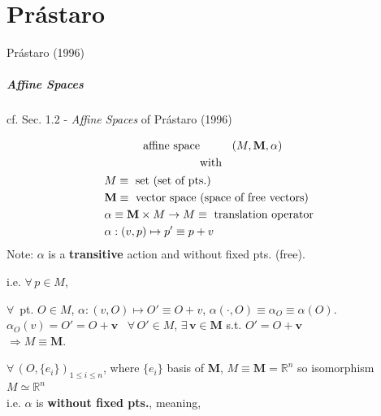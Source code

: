\part{Pr\'{a}staro}


Pr\'{a}staro (1996) \cite{dgdt:Pras1996}

\subsubsection{Affine Spaces}

cf. Sec. 1.2 - \emph{Affine Spaces} of Pr\'{a}staro (1996) \cite{dgdt:Pras1996}

\begin{definition}
  \begin{equation}
\begin{gathered}
    \text{ affine space \qquad \, } (M, \mathbf{M}, \alpha )  \\
    \text{ with } \\
    \begin{aligned}
      & M \equiv \text{ set (set of pts.) }  \\ 
      & \mathbf{M} \equiv \text{ vector space (space of free vectors) } \\
      & \alpha \equiv \mathbf{M} \times M \to M \equiv \text{ translation operator } \\
      & \alpha : (v,p ) \mapsto p' \equiv p + v
      \end{aligned}
\end{gathered}
  \end{equation}
  Note: $\alpha$ is a \textbf{transitive} action and without fixed pts. (free).

  i.e. $\forall \, p \in M$, 
  \end{definition}

$\forall \, $ pt. $O \in M$, $\alpha:(v,O) \mapsto O' \equiv O + v$, $\alpha (\cdot , O) \equiv \alpha_O \equiv \alpha(O)$.  $\alpha_O(v) = O' = O + \mathbf{v}$ \qquad \, $\forall \, O' \in M$, $\exists \, \mathbf{v} \in \mathbf{M}$ s.t. $O' = O + \mathbf{v}$ \\
$\Longrightarrow M \equiv \mathbf{M}$.

$\forall \, (O, \lbrace e_i \rbrace)_{1 \leq i \leq n }$, where $\lbrace e_i \rbrace$ basis of $\mathbf{M}$, $M \equiv \mathbf{M} = \mathbb{R}^n$ so isomorphism $M \simeq \mathbb{R}^n$ \\

i.e. $\alpha$ is \textbf{without fixed pts.}, meaning, 

